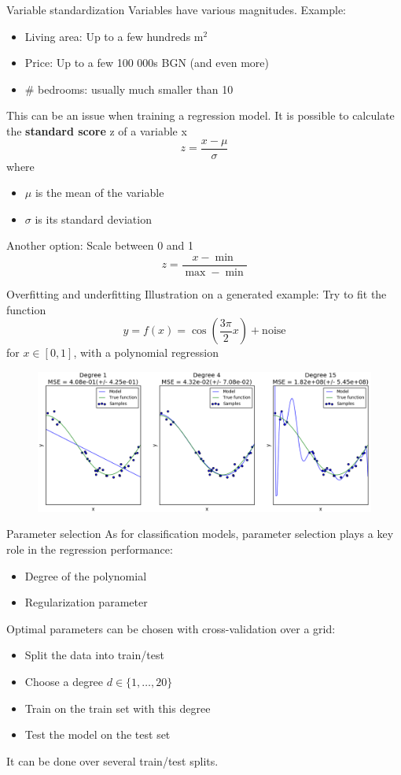 \documentclass{beamer}
\begin{document}
\begin{frame}{Variable standardization}
Variables have various magnitudes. Example:
\begin{itemize}
	\item Living area: Up to a few hundreds m$^2$
	\item Price: Up to a few 100 000s BGN (and even more)
	\item \# bedrooms: usually much smaller than 10
\end{itemize}
This can be an issue when training a regression model.
\vfill
\pause
It is possible to calculate the \textbf{standard score} z of a variable x
$$ z = \dfrac{x - \mu}{\sigma}$$
where
\begin{itemize}
	\item $\mu$ is the mean of the variable
	\item $\sigma$ is its standard deviation
\end{itemize}
\pause
\vfill
Another option: Scale between 0 and 1
$$ z = \dfrac{x - \min}{\max - \min}$$
\end{frame}

\begin{frame}{Overfitting and underfitting}
Illustration on a generated example: Try to fit the function
$$ y = f(x) = \cos \left( \dfrac{3\pi}{2} x \right) + \text{noise}$$
for $x \in [0, 1]$, with a polynomial regression
\pause
\begin{figure}
\centering
\includegraphics[width=\textwidth]{images/over_under_fitting.png}
\end{figure}
\end{frame}

\begin{frame}{Parameter selection}
As for classification models, parameter selection plays a key role in the regression performance:
\begin{itemize}
	\item Degree of the polynomial
	\item Regularization parameter
\end{itemize}
\vfill
\pause
Optimal parameters can be chosen with cross-validation over a grid:
\pause
\begin{itemize}
	\item Split the data into train/test
\pause
	\item Choose a degree $d \in \{ 1,  \dots, 20\}$
\pause
	\item Train on the train set with this degree
\pause
	\item Test the model on the test set
\end{itemize}
\vfill
\pause 
It can be done over several train/test splits.
\end{frame}
\end{document}
